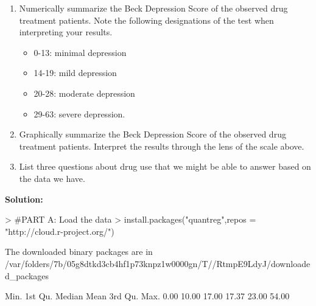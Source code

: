 \documentclass{article}
\begin{document}
\begin{enumerate}
\begin{enumerate}
    \item Numerically summarize the Beck Depression Score of the observed drug 
    treatment patients. Note the following designations of the test when interpreting
    your results.
    \begin{itemize}
      \item 0-13: minimal depression
      \item 14-19: mild depression
      \item 20-28: moderate depression
      \item 29-63: severe depression.
    \end{itemize}
    \item Graphically summarize the Beck Depression Score of the
    observed drug treatment patients. Interpret the results through 
    the lens of the scale above.
    \item List three questions about drug use that we might be able to answer based on the 
    data we have.
  \end{enumerate}
\textbf{Solution:}
\begin{Schunk}
\begin{Sinput}
> #PART A: Load the data
> install.packages("quantreg",repos = "http://cloud.r-project.org/")
\end{Sinput}
\begin{Soutput}
The downloaded binary packages are in
	/var/folders/7b/05g8dtkd3cb4hf1p73knpz1w0000gn/T//RtmpE9LdyJ/downloaded_packages
\end{Soutput}
\begin{Soutput}
   Min. 1st Qu.  Median    Mean 3rd Qu.    Max. 
   0.00   10.00   17.00   17.37   23.00   54.00 
\end{Soutput}
\end{Schunk}


\end{enumerate}
\end{document}
